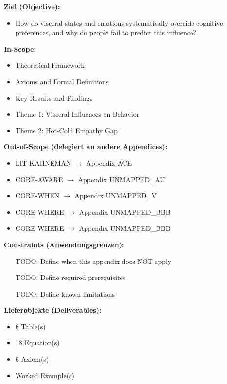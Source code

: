 \begin{tcolorbox}[
    colback=orange!5!white,
    colframe=orange!75!black,
    title={\textbf{Appendix Scope: Ziel / In-Scope / Out-of-Scope / Constraints}},
    fonttitle=\bfseries
]

\textbf{Ziel (Objective):}
\begin{itemize}[nosep]
    \item How do visceral states and emotions systematically override cognitive preferences, and why do people fail to predict this influence?
\end{itemize}

\textbf{In-Scope:}
\begin{itemize}[nosep]
    \item Theoretical Framework
    \item Axioms and Formal Definitions
    \item Key Results and Findings
    \item Theme 1: Visceral Influences on Behavior
    \item Theme 2: Hot-Cold Empathy Gap
\end{itemize}

\textbf{Out-of-Scope (delegiert an andere Appendices):}
\begin{itemize}[nosep]
    \item LIT-KAHNEMAN $\rightarrow$ Appendix ACE
    \item CORE-AWARE $\rightarrow$ Appendix UNMAPPED_AU
    \item CORE-WHEN $\rightarrow$ Appendix UNMAPPED_V
    \item CORE-WHERE $\rightarrow$ Appendix UNMAPPED_BBB
    \item CORE-WHERE $\rightarrow$ Appendix UNMAPPED_BBB
\end{itemize}

\textbf{Constraints (Anwendungsgrenzen):}
\begin{itemize}[nosep]
    \item [TODO: Define when this appendix does NOT apply]
    \item [TODO: Define required prerequisites]
    \item [TODO: Define known limitations]
\end{itemize}

\textbf{Lieferobjekte (Deliverables):}
\begin{itemize}[nosep]
    \item 6 Table(s)
    \item 18 Equation(s)
    \item 6 Axiom(s)
    \item Worked Example(s)
\end{itemize}

\end{tcolorbox}




